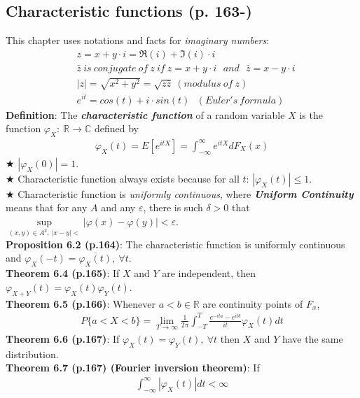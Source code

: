 \documentclass[]{article}
\begin{document}
\subsection{Characteristic functions (p. 163-)}
This chapter uses notations and facts for \emph{imaginary numbers}:
$$
\begin{aligned}
	&z = x + y\cdot i = \Re(i) + \Im(i)\cdot i\\
	&\bar{z}~is~conjugate ~of~z~if~z = x + y\cdot i~~~and~~~\bar{z} = x - y\cdot i\\
	&|z| = \sqrt{x^2 + y^2} = \sqrt{z\bar{z}}~(modulus~of~z)\\
	&e^{it} = cos(t) + i\cdot sin(t) ~~~(Euler's~formula)
\end{aligned}
$$
\textbf{Definition}: The \textbf{\textit{characteristic function}}  of a random variable $X$ is the function $\varphi_X:~\mathbb{R} \rightarrow \mathbb{C}$ defined by
$$
\begin{aligned}
	\varphi_X(t) = E[e^{itX}] = \int_{-\infty}^{\infty}e^{itX} dF_X(x)
\end{aligned}
$$
$\bigstar$ $|\varphi_X(0)|= 1$.\\
$\bigstar$ Characteristic function always exists because for all $t$: $|\varphi_X(t)|\leq 1$.\\
$\bigstar$ Characteristic function is \emph{uniformly continuous}, where \textbf{\textit{Uniform Continuity}} means that for any $A$ and any $\varepsilon$, there is such $\delta>0$ that $\underset{(x,y)\in A^2,~|x-y|<}{\sup}|\varphi(x) - \varphi(y)| < \varepsilon$.\\
\textbf{Proposition 6.2 (p.164)}: The characteristic function is uniformly continuous and $\varphi_X(-t) = \overline{\varphi_X(t)},~\forall t$.\\
\textbf{Theorem 6.4 (p.165)}: If $X$ and $Y$ are independent, then $\varphi_{X+Y}(t) = \varphi_X(t)\varphi_Y(t)$.\\
\textbf{Theorem 6.5 (p.166)}: Whenever $a<b \in \mathbb{R}$ are continuity points of $F_x$,
$$
\begin{aligned}
	P\{a < X < b\} = \lim_{T \rightarrow \infty}\frac{1}{2\pi}\int_{-T}^{T} \frac{e^{-ita} - e^{itb}}{it}\varphi_X(t)dt
\end{aligned}
$$
\textbf{Theorem 6.6 (p.167)}: If $\varphi_X(t)=\varphi_Y(t),~\forall t$ then $X$ and $Y$ have the same distribution.\\
\textbf{Theorem 6.7 (p.167) (Fourier inversion theorem)}: If
$$
\begin{aligned}
	\int_{-\infty}^{\infty} |\varphi_X(t)|dt < \infty
\end{aligned}
$$
\end{document}
